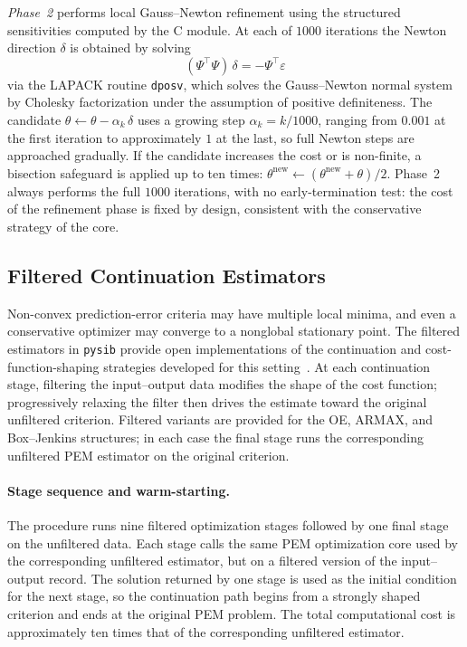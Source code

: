 \documentclass[acmsmall,screen,review]{acmart}
\begin{document}
\emph{Phase~2} performs local Gauss--Newton refinement using the structured
sensitivities computed by the C module.  At each of $1000$ iterations the
Newton direction $\delta$ is obtained by solving
\begin{equation}
  (\Psi^\top\Psi)\,\delta = -\Psi^\top\varepsilon
  \label{eq:newton-system}
\end{equation}
via the LAPACK routine \texttt{dposv}, which solves the Gauss--Newton
normal system by Cholesky factorization under the assumption of positive
definiteness.  The candidate
$\theta \leftarrow \theta - \alpha_k\,\delta$ uses a growing step
$\alpha_k = k/1000$, ranging from $0.001$ at the first iteration to
approximately $1$ at the last, so full Newton steps are approached gradually.
If the candidate increases the cost or is non-finite, a bisection
safeguard is applied up to ten times:
$\theta^{\mathrm{new}} \leftarrow (\theta^{\mathrm{new}} + \theta)/2$.
Phase~2 always performs the full $1000$ iterations, with no
early-termination test: the cost of the refinement phase is fixed by
design, consistent with the conservative strategy of the core.

\subsection{Filtered Continuation Estimators}
\label{subsec:filtered-continuation-estimators}

Non-convex prediction-error criteria may have multiple local minima, and
even a conservative optimizer may converge to a nonglobal stationary point.
The filtered estimators in \texttt{pysib} provide open implementations of
the continuation and cost-function-shaping strategies developed for this
setting~\cite{eckhard2013input,eckhard2017cost}.  At each continuation
stage, filtering the input--output data modifies the shape of the cost
function; progressively relaxing the filter then drives the estimate toward
the original unfiltered criterion.  Filtered variants are provided for the
OE, ARMAX, and Box--Jenkins structures; in each case the final stage
runs the corresponding unfiltered PEM estimator on the original criterion.

\paragraph{Stage sequence and warm-starting.}
The procedure runs nine filtered optimization stages followed by one
final stage on the unfiltered data.  Each stage calls the same PEM
optimization core used by the corresponding unfiltered estimator, but on a
filtered version of the input--output record.  The solution returned by one
stage is used as the initial condition for the next stage, so the
continuation path begins from a strongly shaped criterion and ends at the
original PEM problem.  The total computational cost is approximately ten
times that of the corresponding unfiltered estimator.
\end{document}
